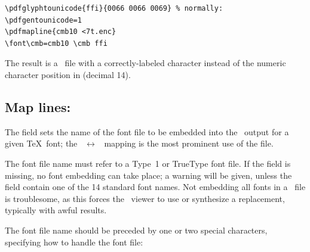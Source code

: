 \documentclass{pdftexmanual}
\begin{document}
\begin{verbatim}
\pdfglyphtounicode{ffi}{0066 0066 0069} % normally: 
\pdfgentounicode=1
\pdfmapline{cmb10 <7t.enc}
\font\cmb=cmb10 \cmb ffi
\end{verbatim}

The result is a \PDF\ file with a correctly-labeled 
character instead of the numeric character position in 
(decimal 14).

\subsection{Map lines: }

The  field sets the name of the font file to be
embedded into the \PDF\ output for a given \TeX\ font; the
~$\leftrightarrow$~ mapping is the
most prominent use of the  file.

The font file name must refer to a Type~1 or TrueType font file. If the
 field is missing, no font embedding can take place; a
warning will be given, unless the  field contain one of
the 14 standard font names. Not embedding all fonts in a \PDF\ file is
troublesome, as this forces the \PDF\ viewer to use or synthesize a
replacement, typically with awful results.

The font file name should be preceded by one or two special characters,
specifying how to handle the font file:
\end{document}
